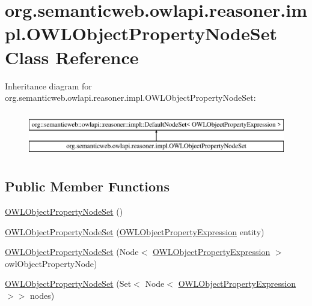 \hypertarget{classorg_1_1semanticweb_1_1owlapi_1_1reasoner_1_1impl_1_1_o_w_l_object_property_node_set}{\section{org.\-semanticweb.\-owlapi.\-reasoner.\-impl.\-O\-W\-L\-Object\-Property\-Node\-Set Class Reference}
\label{classorg_1_1semanticweb_1_1owlapi_1_1reasoner_1_1impl_1_1_o_w_l_object_property_node_set}
}
Inheritance diagram for org.\-semanticweb.\-owlapi.\-reasoner.\-impl.\-O\-W\-L\-Object\-Property\-Node\-Set\-:\begin{figure}[H]
\begin{center}
\leavevmode
\includegraphics[height=2.000000cm]{classorg_1_1semanticweb_1_1owlapi_1_1reasoner_1_1impl_1_1_o_w_l_object_property_node_set}
\end{center}
\end{figure}
\subsection*{Public Member Functions}
\begin{DoxyCompactItemize}
\item 
\hyperlink{classorg_1_1semanticweb_1_1owlapi_1_1reasoner_1_1impl_1_1_o_w_l_object_property_node_set_ac0cda7b496d8a80c6a8979189bcb5f5e}{O\-W\-L\-Object\-Property\-Node\-Set} ()
\item 
\hyperlink{classorg_1_1semanticweb_1_1owlapi_1_1reasoner_1_1impl_1_1_o_w_l_object_property_node_set_a00238a985265132c0abbbcbb04062855}{O\-W\-L\-Object\-Property\-Node\-Set} (\hyperlink{interfaceorg_1_1semanticweb_1_1owlapi_1_1model_1_1_o_w_l_object_property_expression}{O\-W\-L\-Object\-Property\-Expression} entity)
\item 
\hyperlink{classorg_1_1semanticweb_1_1owlapi_1_1reasoner_1_1impl_1_1_o_w_l_object_property_node_set_a23d1713e34313bd7198780a6abbf90a4}{O\-W\-L\-Object\-Property\-Node\-Set} (Node$<$ \hyperlink{interfaceorg_1_1semanticweb_1_1owlapi_1_1model_1_1_o_w_l_object_property_expression}{O\-W\-L\-Object\-Property\-Expression} $>$ owl\-Object\-Property\-Node)
\item 
\hyperlink{classorg_1_1semanticweb_1_1owlapi_1_1reasoner_1_1impl_1_1_o_w_l_object_property_node_set_a2dafaba04062d0f8983fd94efb7ac18c}{O\-W\-L\-Object\-Property\-Node\-Set} (Set$<$ Node$<$ \hyperlink{interfaceorg_1_1semanticweb_1_1owlapi_1_1model_1_1_o_w_l_object_property_expression}{O\-W\-L\-Object\-Property\-Expression} $>$$>$ nodes)
\end{DoxyCompactItemize}

